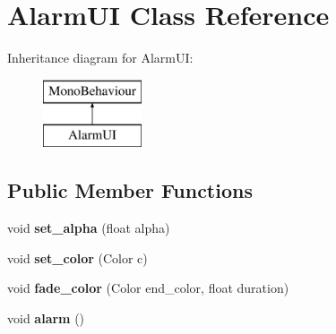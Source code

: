 \hypertarget{class_alarm_u_i}{}\section{Alarm\+UI Class Reference}
\label{class_alarm_u_i}
Inheritance diagram for Alarm\+UI\+:\begin{figure}[H]
\begin{center}
\leavevmode
\includegraphics[height=2.000000cm]{class_alarm_u_i}
\end{center}
\end{figure}
\subsection*{Public Member Functions}
\begin{DoxyCompactItemize}
\item 
\mbox{\label{class_alarm_u_i_a9b62163cb8e9fc84c398d76cdee02ee1}} 
void {\bfseries set\+\_\+alpha} (float alpha)
\item 
\mbox{\label{class_alarm_u_i_a9e02cfe3742873a76c89286496e7c6c5}} 
void {\bfseries set\+\_\+color} (Color c)
\item 
\mbox{\label{class_alarm_u_i_af591e66d57e7a68dce7233c6a1eb0ad8}} 
void {\bfseries fade\+\_\+color} (Color end\+\_\+color, float duration)
\item 
\mbox{\label{class_alarm_u_i_a14e4f2abb8b64b3a697a4f23777f6de7}} 
void {\bfseries alarm} ()
\end{DoxyCompactItemize}

